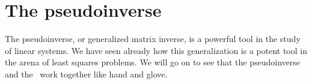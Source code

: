 \chapter{The pseudoinverse}
\label{chap:pseudoinverse}
The pseudoinverse, or generalized matrix inverse, is a powerful tool in the study of linear systems. We have seen already how this generalization is a potent tool in the arena of least squares problems. We will go on to see that the pseudoinverse and the \svdl \ work together like hand and glove.








\endinput